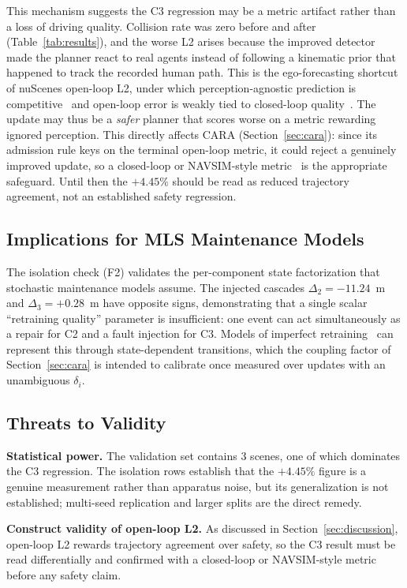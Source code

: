 \documentclass[conference]{IEEEtran}
\begin{document}
This mechanism suggests the C3 regression may be a metric artifact rather than
a loss of driving quality. Collision rate was zero before and after
(Table~\ref{tab:results}), and the worse L2 arises because the improved
detector made the planner react to real agents instead of following a kinematic
prior that happened to track the recorded human path. This is the
ego-forecasting shortcut of nuScenes open-loop L2, under which
perception-agnostic prediction
is competitive~\cite{zhai2023rethinking} and open-loop error is weakly tied to
closed-loop quality~\cite{codevilla2018offline}. The update may thus be a
\emph{safer} planner that scores worse on a metric rewarding ignored
perception. This directly affects CARA (Section~\ref{sec:cara}): since its
admission rule keys on the terminal open-loop metric, it could reject a
genuinely improved update, so a closed-loop or NAVSIM-style
metric~\cite{dauner2024navsim} is the appropriate safeguard. Until then the
$+4.45\%$ should be read as reduced trajectory agreement, not an established
safety regression.

\subsection{Implications for MLS Maintenance Models}
The isolation check (F2) validates the per-component state factorization that
stochastic maintenance models assume. The injected cascades $\Delta_2 =
-11.24$~m and $\Delta_3 = +0.28$~m have opposite signs, demonstrating that a
single scalar ``retraining quality'' parameter is insufficient: one event can
act simultaneously as a repair for C2 and a fault injection for C3. Models of
imperfect retraining~\cite{wang2025issre} can represent this through
state-dependent transitions, which the coupling factor of
Section~\ref{sec:cara} is intended to calibrate once measured over updates with
an unambiguous $\delta_i$.

\subsection{Threats to Validity}
\label{sec:threats}
\textbf{Statistical power.} The validation set contains 3 scenes, one of which
dominates the C3 regression. The isolation rows establish that the $+4.45\%$
figure is a genuine measurement rather than apparatus noise, but its
generalization is not established; multi-seed replication and larger splits are
the direct remedy.

\textbf{Construct validity of open-loop L2.} As discussed in
Section~\ref{sec:discussion}, open-loop L2 rewards trajectory agreement over
safety, so the C3 result must be read differentially and confirmed with a
closed-loop or NAVSIM-style metric~\cite{dauner2024navsim} before any safety
claim.
\end{document}
